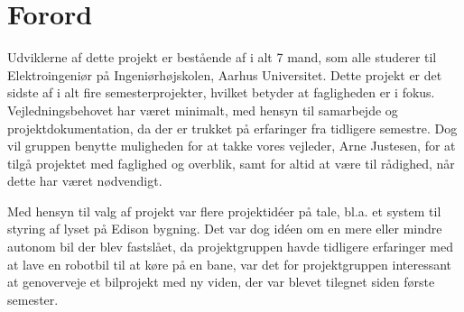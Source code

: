 \chapter{Forord}
\label{ch:Forord}

Udviklerne af dette projekt er bestående af i alt 7 mand, som alle studerer til Elektroingeniør på Ingeniørhøjskolen, Aarhus Universitet. 
Dette projekt er det sidste af i alt fire semesterprojekter, hvilket betyder at fagligheden er i fokus. 
Vejledningsbehovet har været minimalt, med hensyn til samarbejde og projektdokumentation, da der er trukket på erfaringer fra tidligere semestre. 
Dog vil gruppen benytte muligheden for at takke vores vejleder, Arne Justesen, for at tilgå projektet med faglighed og overblik, samt for altid at være til rådighed, når dette har været nødvendigt.  

Med hensyn til valg af projekt var flere projektidéer på tale, bl.a. et system til styring af lyset på Edison bygning.
Det var dog idéen om en mere eller mindre autonom bil der blev fastslået, da projektgruppen havde tidligere erfaringer med at lave en robotbil til at køre på en bane, var det for projektgruppen interessant at genoverveje et bilprojekt med ny viden, der var blevet tilegnet siden første semester. 
\clearpage